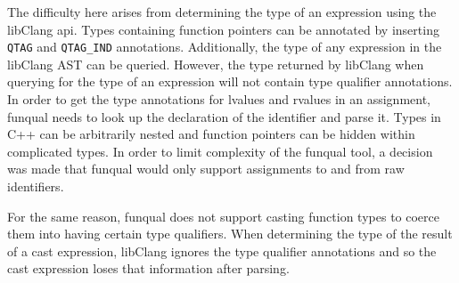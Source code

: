 The difficulty here arises from determining the type of an expression using the libClang api.  Types containing function pointers can be annotated by inserting \lstinline{QTAG} and \lstinline{QTAG_IND} annotations.  Additionally, the type of any expression in the libClang AST can be queried.  However, the type returned by libClang when querying for the type of an expression will not contain type qualifier annotations.  In order to get the type annotations for lvalues and rvalues in an assignment, funqual needs to look up the declaration of the identifier and parse it.  Types in C++ can be arbitrarily nested and function pointers can be hidden within complicated types.  In order to limit complexity of the funqual tool, a decision was made that funqual would only support assignments to and from raw identifiers.  

For the same reason, funqual does not support casting function types to coerce them into having certain type qualifiers.  When determining the type of the result of a cast expression, libClang ignores the type qualifier annotations and so the cast expression loses that information after parsing.  
